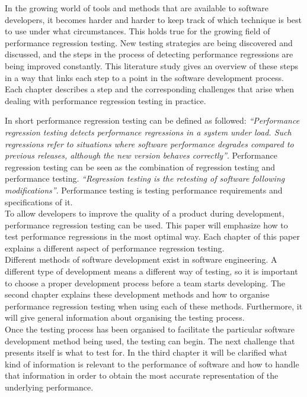 In the growing world of tools and methods that are available to software developers, it becomes harder and harder to keep track of which technique is best to use under what circumstances. This holds true for the growing field of performance regression testing. New testing strategies are being discovered and discussed, and the steps in the process of detecting performance regressions are being improved constantly. This literature study gives an overview of these steps in a way that links each step to a point in the software development process. Each chapter describes a step and the corresponding challenges that arise when dealing with performance regression testing in practice.

In short performance regression testing can be defined as followed: \textit{``Performance regression testing detects performance
regressions in a system under load. Such regressions refer to
situations where software performance degrades compared to
previous releases, although the new version behaves correctly''}\cite{foo2010mining}.
Performance regression testing can be seen as the combination of regression testing and performance testing. \textit{``Regression testing is the retesting of software following modifications''}\cite{rothermel2001prioritizing}. Performance testing is testing performance requirements and specifications of it\cite{gan2006software}. \\

To allow developers to improve the quality of a product during development, performance regression testing can be used. This paper will emphasize how to test performance regressions in the most optimal way. Each chapter of this paper explains a different aspect of performance regression testing. \\

Different methods of software development exist in software engineering. A different type of development means a different way of testing, so it is important to choose a proper development process before a team starts developing. The second chapter explains these development methods and how to organise performance regression testing when using each of these methods. Furthermore, it will give general information about organising the testing process. \\

Once the testing process has been organised to facilitate the particular software development method being used, the testing can begin. The next challenge that presents itself is what to test for. In the third chapter it will be clarified what kind of information is relevant to the performance of software and how to handle that information in order to obtain the most accurate representation of the underlying performance. \\

